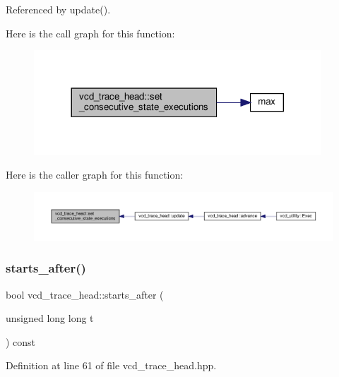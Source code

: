 Referenced by update().

Here is the call graph for this function\+:
\nopagebreak
\begin{figure}[H]
\begin{center}
\leavevmode
\includegraphics[width=305pt]{df/d30/structvcd__trace__head_acdcc6eecd8b483590b6974d51cc9a8fc_cgraph}
\end{center}
\end{figure}
Here is the caller graph for this function\+:
\nopagebreak
\begin{figure}[H]
\begin{center}
\leavevmode
\includegraphics[width=350pt]{df/d30/structvcd__trace__head_acdcc6eecd8b483590b6974d51cc9a8fc_icgraph}
\end{center}
\end{figure}
\mbox{\label{structvcd__trace__head_a71368425927cf032fcbfa62d280f8a6e}} 
\subsubsection{\texorpdfstring{starts\+\_\+after()}{starts\_after()}}
{\footnotesize\ttfamily bool vcd\+\_\+trace\+\_\+head\+::starts\+\_\+after (\begin{DoxyParamCaption}\item[{unsigned long long}]{t }\end{DoxyParamCaption}) const\hspace{0.3cm}{\ttfamily [inline]}}



Definition at line 61 of file vcd\+\_\+trace\+\_\+head.\+hpp.



